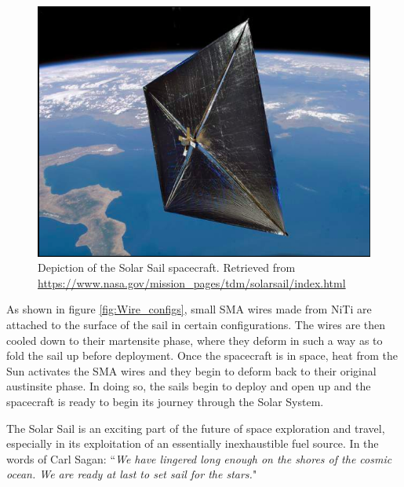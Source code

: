 \begin{multicols}{2}
\begin{figure}[H]
    \centering
    \includegraphics[scale=0.25]{._figures/solar sail.png}
    \caption[Depiction of the Solar Sail spacecraft]{Depiction of the Solar Sail spacecraft. Retrieved from
    \url{https://www.nasa.gov/mission\_pages/tdm/solarsail/index.html}}
    \label{fig:solar_sail}
\end{figure}

As shown in figure \ref{fig:Wire_configs}, small SMA wires made from NiTi are attached to the surface of the sail in certain configurations. The wires are then cooled down to their martensite phase, where they deform in such a way as to fold the sail up before deployment. Once the spacecraft is in space, heat from the Sun activates the SMA wires and they begin to deform back to their original austinsite phase. In doing so, the sails begin to deploy and open up and the spacecraft is ready to begin its journey through the Solar System.

The Solar Sail is an exciting part of the future of space exploration and travel, especially in its exploitation of an essentially inexhaustible fuel source. In the words of Carl Sagan: ``\textit{We have lingered long enough on the shores of the cosmic ocean. We are ready at last to set sail for the stars.}"


\end{multicols}
